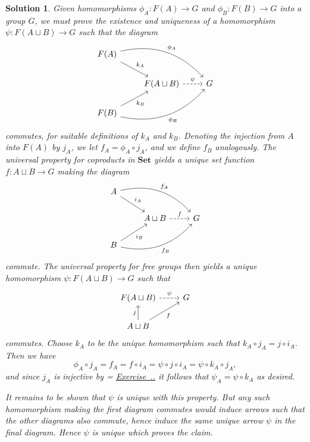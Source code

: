 \documentclass[article, a4paper, 11pt, oneside]{memoir}
\numberwithin{equation}{chapter}
\newcommand{\ncat}[1]{\mathbf{#1}} %
\newcommand{\catSet}{\ncat{Set}} %
\newcommand{\RNum}[1]{\uppercase\expandafter{\romannumeral #1\relax}}
\newcommand{\exref}[1]{%
    \setsepchar{.}%
    \readlist*\mylist{#1}%
    \ifnum \arabic{chapter}=\mylist[1]
        \def\mylabel{\mylist[2].\mylist[3]}%
    \else
        \def\mylabel{\RNum{\mylist[1]}.\mylist[2].\mylist[3]}%
    \fi
    \hyperref[ex:#1]{Exercise~\mylabel}%
}
\theoremstyle{nonumberplain}
\newtheorem{solution}{Solution}
\renewcommand{\coprod}{\sqcup}
\begin{document}
\begin{solution}
    Given homomorphisms $\phi_A \colon F(A) \to G$ and $\phi_B \colon F(B) \to G$ into a group $G$, we must prove the existence and uniqueness of a homomorphism $\psi \colon F(A \coprod B) \to G$ such that the diagram
    \begin{equation*}
        \begin{tikzcd}
            F(A)
                \ar[dr, "k_A"]
                \ar[drr, "\phi_A", bend left] \\
            & F(A \coprod B)
                \ar[r, "\psi", dashed]
            & G \\
            F(B)
                \ar[ur, "k_B", swap]
                \ar[urr, "\phi_B", bend right, swap]
        \end{tikzcd}
    \end{equation*}
    commutes, for suitable definitions of $k_A$ and $k_B$. Denoting the injection from $A$ into $F(A)$ by $j_A$, we let $f_A = \phi_A \circ j_A$, and we define $f_B$ analogously. The universal property for coproducts in $\catSet$ yields a unique set function $f \colon A \coprod B \to G$ making the diagram
    \begin{equation*}
        \begin{tikzcd}
            A
                \ar[dr, "i_A"]
                \ar[drr, "f_A", bend left] \\
            & A \coprod B
                \ar[r, "f", dashed]
            & G \\
            B
                \ar[ur, "i_B", swap]
                \ar[urr, "f_B", bend right, swap]
        \end{tikzcd}
    \end{equation*}
    commute. The universal property for free groups then yields a unique homomorphism $\psi \colon F(A \coprod B) \to G$ such that
    \begin{equation*}
        \begin{tikzcd}
            F(A \coprod B)
                \ar[r, "\psi", dashed]
            & G \\
            A \coprod B
                \ar[u, "j"]
                \ar[ur, "f", swap]
        \end{tikzcd}
    \end{equation*}
    commutes. Choose $k_A$ to be the unique homomorphism such that $k_A \circ j_A  = j \circ i_A$. Then we have
    \begin{equation*}
        \phi_A \circ j_A
            = f_A
            = f \circ i_A
            = \psi \circ j \circ i_A
            = \psi \circ k_A \circ j_A,
    \end{equation*}
    and since $j_A$ is injective by \exref{2.5.3} it follows that $\psi_A = \psi \circ k_A$ as desired.

    It remains to be shown that $\psi$ is unique with this property. But any such homomorphism making the first diagram commutes would induce arrows such that the other diagrams also commute, hence induce the same unique arrow $\psi$ in the final diagram. Hence $\psi$ is unique which proves the claim.
\end{solution}
\end{document}
